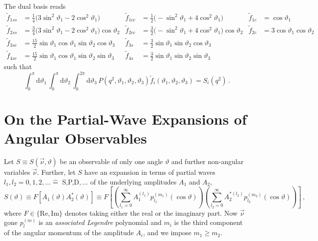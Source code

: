 \documentclass[aps,prd,reprint,nofootinbib,preprintnumbers]{revtex4}
\newcommand{\dual}[1]{\tilde{#1}}
\newcommand{\nuvec}{\vec{\nu}}
\newcommand{\rmdx}[1]{\mbox{d} #1 \,} %
\renewcommand{\theta}{\vartheta}
\newcommand{\fred}[1]{{\color{brown!85!black}#1}}
\begin{document}
The dual basis reads
\begin{equation}
    \begin{aligned}
        \dual f_{1ss} & = \frac{1}{4}\big(3 \sin^2\theta_1 - 2 \cos^2\theta_1\big) &
        \dual f_{1cc} & = \frac{1}{2}\big(- \sin^2\theta_1 + 4 \cos^2\theta_1\big) &
        \dual f_{1c}  & = \cos\theta_1\\
        \dual f_{2ss} & = \frac{3}{4}\big(3 \sin^2\theta_1 - 2 \cos^2\theta_1\big) \cos\theta_2 &
        \dual f_{2cc} & = \frac{3}{2}\big(- \sin^2\theta_1 + 4 \cos^2\theta_1\big) \cos\theta_2 &
        \dual f_{2c}  & = 3 \cos\theta_1   \cos\theta_2 \\
        \dual f_{3sc} & = \frac{15}{2}\sin\theta_1 \cos\theta_1 \sin\theta_2 \cos\theta_3 &
        \dual f_{3s}  & = \frac{3}{2} \sin\theta_1              \sin\theta_2 \cos\theta_3 \\
        \dual f_{4sc} & = \frac{15}{2}\sin\theta_1 \cos\theta_1 \sin\theta_2 \sin\theta_3 &
        \dual f_{4s}  & = \frac{3}{2} \sin\theta_1              \sin\theta_2 \sin\theta_3
    \end{aligned}
\end{equation}
such that
\begin{equation}
    \int_0^\pi \rmdx{\theta_1} \int_0^\pi \rmdx{\theta_2} \int_0^{2\pi} \rmdx{\theta_3} P(q^2, \theta_1, \theta_2, \theta_3) \dual{f}_i(\theta_1, \theta_2, \theta_3) = S_i(q^2)\,.
\end{equation}


\section{On the Partial-Wave Expansions of Angular Observables}
\label{app:partial-waves}

Let $S \equiv S(\vec{\nu},\theta)$ be an observable of only one angle $\theta$ and further non-angular variables $\vec{\nu}$. Further, let
$S$ have an expansion in terms of partial waves $l_1, l_2 = 0,1,2,\dots \hat{=}$ S,P,D$,\dots$ of the underlying amplitudes $A_1$ and $A_2$,
\begin{equation}
    \label{eq:def-partial-wave-observable}
    S(\theta) \equiv F\left[A_1(\theta) A_2^*(\theta)\right] \equiv F\left[\left(\sum_{l_1=0}^\infty A_1^{(l_1)} p_{l_1}^{(m_1)}(\cos\theta)\right) \left(\sum_{l_2=0}^\infty A_2^{*(l_2)} p_{l_2}^{(m_2)}(\cos\theta)\right)\right]\,,
\end{equation}
where $F \in \{\text{Re},\text{Im}\}$ denotes taking either the real
or the imaginary part. \fred{Now $\nuvec$ gone}
$p_{l}^{(m)}$ is an \emph{associated Legendre} polynomial and $m_i$ is the third component of the angular momentum of the amplitude $A_i$, and we impose $m_1 \geq m_2$.\\
\end{document}
